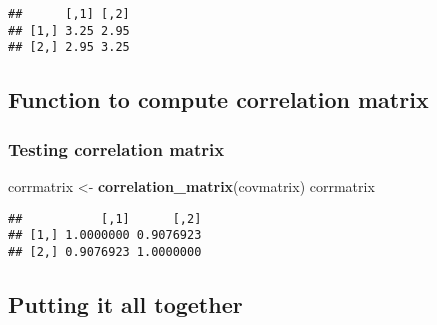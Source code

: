 \documentclass[]{article}
\newenvironment{Shaded}{\begin{snugshade}}{\end{snugshade}}
\newcommand{\ControlFlowTok}[1]{\textcolor[rgb]{0.13,0.29,0.53}{\textbf{#1}}}
\newcommand{\DecValTok}[1]{\textcolor[rgb]{0.00,0.00,0.81}{#1}}
\newcommand{\KeywordTok}[1]{\textcolor[rgb]{0.13,0.29,0.53}{\textbf{#1}}}
\newcommand{\NormalTok}[1]{#1}
\newcommand{\OperatorTok}[1]{\textcolor[rgb]{0.81,0.36,0.00}{\textbf{#1}}}
\newcommand{\StringTok}[1]{\textcolor[rgb]{0.31,0.60,0.02}{#1}}
\begin{document}
\begin{verbatim}
##      [,1] [,2]
## [1,] 3.25 2.95
## [2,] 2.95 3.25
\end{verbatim}

\hypertarget{function-to-compute-correlation-matrix}{%
\subsection{Function to compute correlation
matrix}\label{function-to-compute-correlation-matrix}}

\begin{Shaded}
\end{Shaded}

\hypertarget{testing-correlation-matrix}{%
\subsubsection{Testing correlation
matrix}\label{testing-correlation-matrix}}

\begin{Shaded}
\begin{Highlighting}[]
\NormalTok{corrmatrix <-}\StringTok{ }\KeywordTok{correlation_matrix}\NormalTok{(covmatrix)}
\NormalTok{corrmatrix}
\end{Highlighting}
\end{Shaded}

\begin{verbatim}
##           [,1]      [,2]
## [1,] 1.0000000 0.9076923
## [2,] 0.9076923 1.0000000
\end{verbatim}

\hypertarget{putting-it-all-together}{%
\subsection{Putting it all together}\label{putting-it-all-together}}
\end{document}
